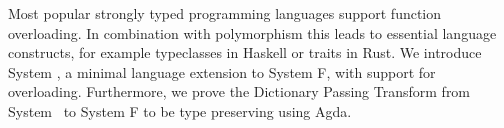 Most popular strongly typed programming languages support function overloading. 
In combination with polymorphism this leads to essential language constructs, for example typeclasses in Haskell or traits in Rust.  
We introduce System \Fo, a minimal language extension to System F, with support for overloading.
Furthermore, we prove the Dictionary Passing Transform from System \Fo\ to System F to be type preserving using Agda.
